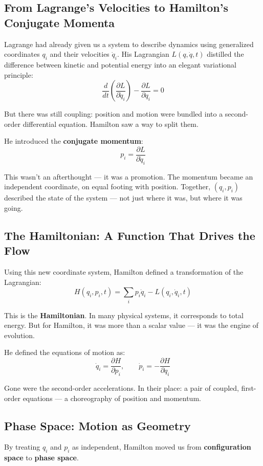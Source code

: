 \subsection{From Lagrange’s Velocities to Hamilton’s Conjugate Momenta}

Lagrange had already given us a system to describe dynamics using generalized coordinates \( q_i \) and their velocities \( \dot{q}_i \). His Lagrangian \( L(q, \dot{q}, t) \) distilled the difference between kinetic and potential energy into an elegant variational principle:
\[
\frac{d}{dt} \left( \frac{\partial L}{\partial \dot{q}_i} \right) - \frac{\partial L}{\partial q_i} = 0
\]

But there was still coupling: position and motion were bundled into a second-order differential equation. Hamilton saw a way to split them.

He introduced the \textbf{conjugate momentum}:
\[
p_i = \frac{\partial L}{\partial \dot{q}_i}
\]

This wasn’t an afterthought — it was a promotion. The momentum became an independent coordinate, on equal footing with position.  
Together, \( (q_i, p_i) \) described the state of the system — not just where it was, but where it was going.

\subsection{The Hamiltonian: A Function That Drives the Flow}

Using this new coordinate system, Hamilton defined a transformation of the Lagrangian:
\[
H(q_i, p_i, t) = \sum_i p_i \dot{q}_i - L(q_i, \dot{q}_i, t)
\]

This is the \textbf{Hamiltonian}. In many physical systems, it corresponds to total energy.  
But for Hamilton, it was more than a scalar value — it was the engine of evolution.

He defined the equations of motion as:
\[
\dot{q}_i = \frac{\partial H}{\partial p_i}, \qquad \dot{p}_i = -\frac{\partial H}{\partial q_i}
\]

Gone were the second-order accelerations.  
In their place: a pair of coupled, first-order equations — a choreography of position and momentum.

\subsection{Phase Space: Motion as Geometry}

By treating \( q_i \) and \( p_i \) as independent, Hamilton moved us from \textbf{configuration space} to \textbf{phase space}.

